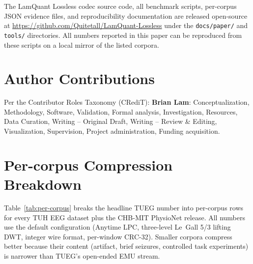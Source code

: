 \documentclass[journal]{IEEEtran}
\begin{document}
The LamQuant Lossless codec source code, all benchmark scripts,
per-corpus JSON evidence files, and reproducibility documentation
are released open-source at
\url{https://github.com/Quitetall/LamQuant-Lossless} under the
\texttt{docs/paper/} and \texttt{tools/} directories. All numbers
reported in this paper can be reproduced from these scripts on a
local mirror of the listed corpora.

\section*{Author Contributions}
Per the Contributor Roles Taxonomy (CRediT):
\textbf{Brian Lam}: Conceptualization, Methodology, Software,
Validation, Formal analysis, Investigation, Resources, Data
Curation, Writing -- Original Draft, Writing -- Review \& Editing,
Visualization, Supervision, Project administration, Funding
acquisition.





\appendices

\section{Per-corpus Compression Breakdown}
\label{app:per-corpus}

Table~\ref{tab:per-corpus} breaks the headline TUEG number into
per-corpus rows for every TUH EEG dataset plus the CHB-MIT
PhysioNet release. All numbers use the default configuration
(Anytime LPC, three-level Le~Gall 5/3 lifting DWT, integer wire
format, per-window CRC-32). Smaller corpora compress better
because their content (artifact, brief seizures, controlled
task experiments) is narrower than TUEG's open-ended EMU stream.
\end{document}
